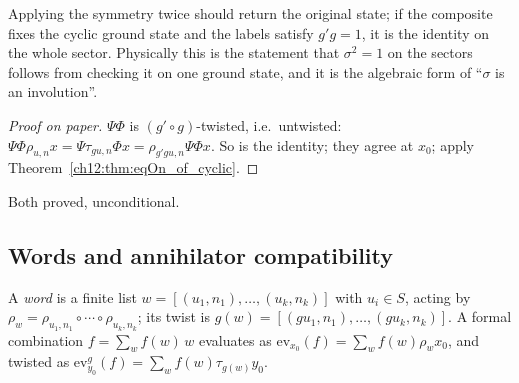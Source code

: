 \begin{physics}
Applying the symmetry twice should return the original state; if the composite fixes the cyclic ground state and the labels satisfy $g'g=1$, it is the identity on the whole sector. Physically this is the statement that $\sigma^2=1$ on the sectors follows from checking it on one ground state, and it is the algebraic form of ``$\sigma$ is an involution''.
\end{physics}
\begin{proof}[Proof on paper]
$\Psi\Phi$ is $(g'\circ g)$-twisted, i.e.\ untwisted: $\Psi\Phi\rho_{u,n}x=\Psi\tau_{gu,n}\Phi x=\rho_{g'gu,n}\Psi\Phi x$.
So is the identity; they agree at $x_0$; apply Theorem~\ref{ch12:thm:eqOn_of_cyclic}.
\end{proof}
\begin{status}Both proved, unconditional.\end{status}

\subsection{Words and annihilator compatibility}

A \emph{word} is a finite list $w=[(u_1,n_1),\dots,(u_k,n_k)]$ with $u_i\in S$, acting by
$\rho_w=\rho_{u_1,n_1}\circ\cdots\circ\rho_{u_k,n_k}$; its twist is $g(w)=[(gu_1,n_1),\dots,(gu_k,n_k)]$.  A
formal combination $f=\sum_wf(w)\,w$ evaluates as $\mathrm{ev}_{x_0}(f)=\sum_wf(w)\rho_wx_0$, and twisted as
$\mathrm{ev}^g_{y_0}(f)=\sum_wf(w)\tau_{g(w)}y_0$.

